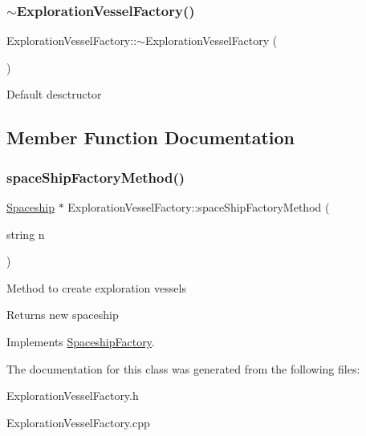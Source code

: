 \subsubsection{\texorpdfstring{$\sim$\+Exploration\+Vessel\+Factory()}{~ExplorationVesselFactory()}}
{\footnotesize\ttfamily Exploration\+Vessel\+Factory\+::$\sim$\+Exploration\+Vessel\+Factory (\begin{DoxyParamCaption}{ }\end{DoxyParamCaption})}

Default desctructor 

\subsection{Member Function Documentation}
\mbox{\label{classExplorationVesselFactory_a67f065b62fedea7805291bd7a3d0b81d}} 
\subsubsection{\texorpdfstring{space\+Ship\+Factory\+Method()}{spaceShipFactoryMethod()}}
{\footnotesize\ttfamily \hyperlink{classSpaceship}{Spaceship} $\ast$ Exploration\+Vessel\+Factory\+::space\+Ship\+Factory\+Method (\begin{DoxyParamCaption}\item[{string}]{n }\end{DoxyParamCaption})\hspace{0.3cm}{\ttfamily [virtual]}}

Method to create exploration vessels \begin{DoxyReturn}{Returns}
new spaceship 
\end{DoxyReturn}


Implements \hyperlink{classSpaceshipFactory_a70b50dd616cb16f50088eff9ca07cda9}{Spaceship\+Factory}.



The documentation for this class was generated from the following files\+:\begin{DoxyCompactItemize}
\item 
Exploration\+Vessel\+Factory.\+h\item 
Exploration\+Vessel\+Factory.\+cpp\end{DoxyCompactItemize}

